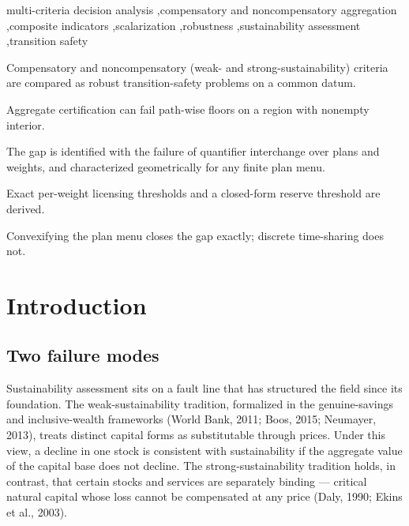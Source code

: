 \documentclass[3p,11pt]{elsarticle}
\begin{document}
\begin{frontmatter}
\begin{abstract}
\end{abstract}

\begin{keyword}
multi-criteria decision analysis \sep compensatory and noncompensatory aggregation \sep composite indicators \sep scalarization \sep robustness \sep sustainability assessment \sep transition safety
\end{keyword}

\begin{highlights}
\item Compensatory and noncompensatory (weak- and strong-sustainability) criteria are compared as robust transition-safety problems on a common datum.
\item Aggregate certification can fail path-wise floors on a region with nonempty interior.
\item The gap is identified with the failure of quantifier interchange over plans and weights, and characterized geometrically for any finite plan menu.
\item Exact per-weight licensing thresholds and a closed-form reserve threshold are derived.
\item Convexifying the plan menu closes the gap exactly; discrete time-sharing does not.
\end{highlights}

\end{frontmatter}

\section{Introduction}\label{introduction}

\subsection{Two failure modes}\label{two-failure-modes}

Sustainability assessment sits on a fault line that has structured the
field since its foundation. The weak-sustainability tradition,
formalized in the genuine-savings and inclusive-wealth frameworks (World
Bank, 2011; Boos, 2015; Neumayer, 2013), treats distinct capital forms
as substitutable through prices. Under this view, a decline in one stock
is consistent with sustainability if the aggregate value of the capital
base does not decline. The strong-sustainability tradition holds, in
contrast, that certain stocks and services are separately binding ---
critical natural capital whose loss cannot be compensated at any price
(Daly, 1990; Ekins et al., 2003).
\end{document}
